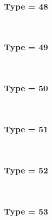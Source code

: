 \documentclass{article}
\begin{document}
            \\
        
        
        
            \subsubsection*{Type = 48}    
            
            \\
        
        
        
            \subsubsection*{Type = 49}    
            
            \\
        
        
        
            \subsubsection*{Type = 50}    
            
            \\
        
        
        
            \subsubsection*{Type = 51}    
            
            \\
        
        
        
            \subsubsection*{Type = 52}    
            
            \\
        
        
        
            \subsubsection*{Type = 53}    
            
            \\
        
\end{document}
